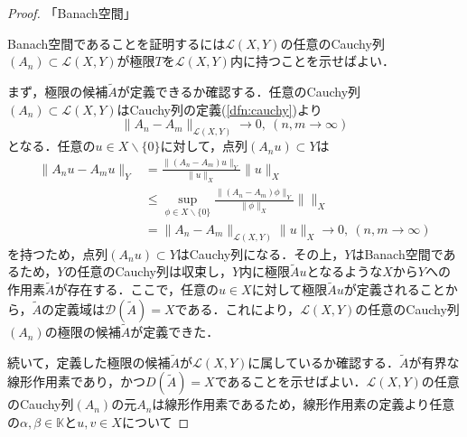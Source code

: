 \documentclass[11pt,a4paper]{jsarticle}
\theoremstyle{definition}
\begin{document}
\begin{proof}
  「Banach空間」

  Banach空間であることを証明するには$\mathcal{L}(X,Y)$の任意のCauchy列$(A_n)\subset \mathcal{L}(X,Y)$が極限$T$を$\mathcal{L}(X,Y)$内に持つことを示せばよい．

  まず，極限の候補$\tilde{A}$が定義できるか確認する．任意のCauchy列$(A_n)\subset \mathcal{L}(X,Y)$はCauchy列の定義(\ref{dfn:cauchy})より
  \begin{equation*}
    \|A_n-A_m\|_{\mathcal{L}(X,Y)} \rightarrow 0,\ (n,m\rightarrow \infty)
  \end{equation*}
  となる．任意の$u\in X\backslash \{0\}$に対して，点列$(A_nu) \subset Y$は
  \begin{align*}
    \|A_n u-A_mu\|_Y & = \frac{\|(A_n-A_m)u\|_Y}{\|u\|_X}\|u\|_X                                         \\
                     & \leq \sup_{\phi\in X\backslash\{0\}} \frac{\|(A_n-A_m)\phi\|_Y}{\|\phi\|_X}\|\|_X \\
                     & = \|A_n-A_m\|_{\mathcal{L}(X,Y)}\|u\|_X \rightarrow 0,\ (n,m \rightarrow \infty)
  \end{align*}
  を持つため，点列$(A_nu)\subset Y$はCauchy列になる．その上，$Y$はBanach空間であるため，$Y$の任意のCauchy列は収束し，$Y$内に極限$\tilde{A}u$となるような$X$から$Y$への作用素$\tilde{A}$が存在する．ここで，任意の$u\in X$に対して極限$\tilde{A}u$が定義されることから，$\tilde{A}$の定義域は$\mathcal{D}(\tilde{A})=X$である．これにより，$\mathcal{L}(X,Y)$の任意のCauchy列$(A_n)$の極限の候補$\tilde{A}$が定義できた．

  続いて，定義した極限の候補$\tilde{A}$が$\mathcal{L}(X,Y)$に属しているか確認する．$\tilde{A}$が有界な線形作用素であり，かつ$D(\tilde{A})=X$であることを示せばよい．$\mathcal{L}(X,Y)$の任意のCauchy列$(A_n)$の元$A_n$は線形作用素であるため，線形作用素の定義より任意の$\alpha,\beta \in \mathbb{K}$と$u,v\in X$について


\end{proof}
\end{document}
